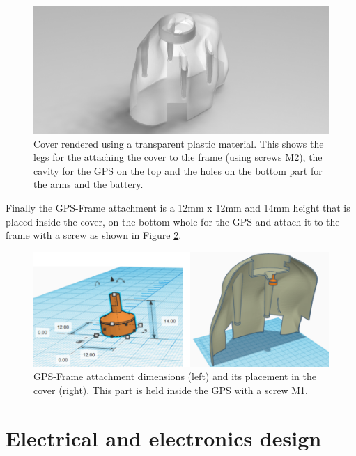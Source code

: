 \begin{figure}[!h]
    \centering
    \includegraphics[width=\textwidth]{Figures/hardware/cover_transPlastic.JPG}
    \caption{Cover rendered using a transparent plastic material. This shows the legs for the attaching the cover to the frame (using screws M2), the cavity for the GPS on the top and the holes on the bottom part for the arms and the battery.}
    \label{fig:hw_cover}
\end{figure}

Finally the GPS-Frame attachment is a 12mm x 12mm and 14mm height that is placed inside the cover, on the bottom whole for the GPS and attach it to the frame with a screw as shown in Figure \ref{fig:hw_gps}.

\begin{figure}[!ht]
    \centering
    \includegraphics[width=\textwidth]{Figures/hardware/GPS_Attach.png}
    \caption{GPS-Frame attachment dimensions (left) and its placement in the cover (right). This part is held inside the GPS with a screw M1.}
    \label{fig:hw_gps}
\end{figure}

\vfill %
\clearpage
\newpage
\section{Electrical and electronics design}\label{sec:hw_elec}

